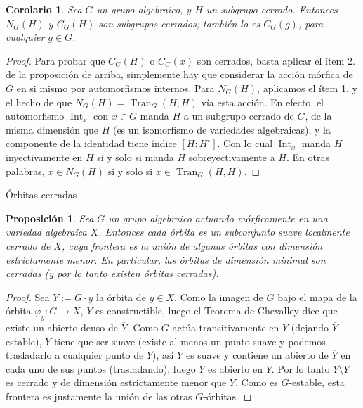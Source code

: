 \documentclass[spanish,10pt]{amsart}
\makeatletter
\renewcommand\subsection{\@startsection{subsection}{2}%
  \z@{.5\linespacing\@plus.7\linespacing}{-.5em}%
  {\normalfont\sffamily}}
\newtheorem{corollary}[theorem]{Corolario}
\newtheorem{proposition}[theorem]{Proposición}
\theoremstyle{definition}
\theoremstyle{remark}
\numberwithin{equation}{section}
\renewcommand{\bar}[1]{\overline{#1}}
\makeatother
\begin{document}
\begin{corollary}
Sea $G$ un grupo algebraico, y $H$ un subgrupo cerrado. Entonces $N_G (H)$ y $C_G (H)$ son subgrupos cerrados; también lo es $C_G (g)$, para cualquier $g \in G$.
\end{corollary}
\begin{proof}
Para probar que $C_G (H)$ o $C_G (x)$ son cerrados, basta aplicar el ítem 2. de la proposición de arriba, simplemente hay que considerar la acción mórfica de $G$ en si mismo por automorfismos internos. Para $N_G (H)$, aplicamos el ítem 1. y el hecho de que $N_G (H) = \operatorname{Tran}_G (H,H)$ vía esta acción. En efecto, el automorfismo $\operatorname{Int}_x$ con $x \in G$ manda $H$ a un subgrupo cerrado de $G$, de la misma dimensión que $H$ (es un isomorfismo de variedades algebraicas), y la componente de la identidad tiene índice $[H : H^\circ]$. Con lo cual $\operatorname{Int}_x$ manda $H$ inyectivamente en $H$ si y solo si manda $H$ sobreyectivamente a $H$. En otras palabras, $x \in N_G (H)$ si y solo si $x \in \operatorname {Tran}_G (H, H)$.
\end{proof}



\subsection{Órbitas cerradas}

\begin{proposition}\label{proposition:orbita cerrada}
Sea $G$ un grupo algebraico actuando mórficamente en una variedad algebraica $X$. Entonces cada órbita es un subconjunto suave localmente cerrado de $X$, cuya frontera es la unión de algunas órbitas con dimensión estrictamente menor. En particular, las órbitas de dimensión minimal son cerradas (y por lo tanto existen órbitas cerradas).
\end{proposition}

\begin{proof}
Sea $Y := G \cdot y$ la órbita de $y \in X$. Como la imagen de $G$ bajo el mapa de la órbita $\varphi_y : G \to X$, $Y$ es constructible, luego el Teorema de Chevalley dice que existe un abierto denso de $\bar Y$. Como $G$ actúa transitivamente en $Y$ (dejando $\bar Y$ estable), $Y$ tiene que ser suave (existe al menos un punto suave y podemos trasladarlo a cualquier punto de $Y$), así $Y$ es suave y contiene un abierto de $\bar Y$ en cada uno de sus puntos (trasladando), luego $Y$ es abierto en $\bar Y$. Por lo tanto $\bar Y \setminus Y$ es cerrado y de dimensión estrictamente menor que $\bar Y$. Como es $G$-estable, esta frontera es justamente la unión de las otras $G$-órbitas.
\end{proof}
\end{document}

